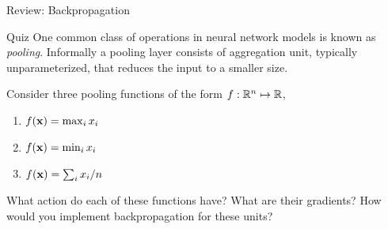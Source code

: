 \documentclass{beamer}
\begin{document}
\begin{frame}{Review: Backpropagation}
  \begin{center}

  \end{center}
\end{frame}


\begin{frame}{Quiz}
  One common class of operations in neural network models is known as
  \textit{pooling}. Informally a pooling layer consists of aggregation
  unit, typically unparameterized, that reduces the input to a smaller
  size.
  \air

  Consider three pooling functions of the form $f: \mathbb{R}^n \mapsto \mathbb{R}$,
  \begin{enumerate}
  \item $ f(\mathbf{x}) = \max_{i} x_i $
  \item $ f(\mathbf{x}) = \min_{i} x_i $
  \item $ f(\mathbf{x}) = \sum_i x_i / n $
  \end{enumerate}
  \air

  What action do each of these functions have? What are their gradients?
  How would you implement backpropagation for these units?
\end{frame}
\end{document}
